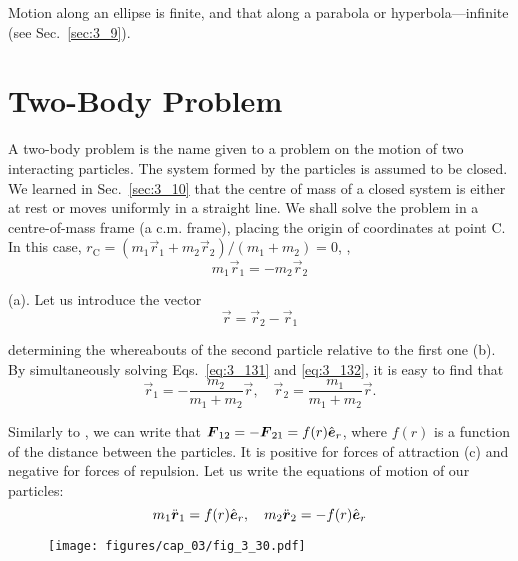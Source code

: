 Motion along an ellipse is finite, and that along a parabola or hyperbola---infinite (see Sec.~\ref{sec:3_9}).

\section{Two-Body Problem}\label{sec:3_19}

A two-body problem is the name given to a problem on the motion of two interacting particles. The system formed by the particles is assumed to be closed. We learned in Sec.~\ref{sec:3_10} that the centre of mass of a closed system is either at rest or moves uniformly in a straight line. We shall solve the problem in a centre-of-mass frame (a c.m. frame), placing the origin of coordinates at point C. In this case, $r_{\text{C}}=(m_1\vec{r}_1+m_2\vec{r}_2)/(m_1+m_2)=0$, \ie,
\begin{equation}\label{eq:3_131}
m_1\vec{r}_1 = -m_2\vec{r}_2
\end{equation}

\noindent
(a). Let us introduce the vector
\begin{equation}\label{eq:3_132}
\vec{r} = \vec{r}_2 - \vec{r}_1
\end{equation}

\noindent
determining the whereabouts of the second particle relative to the first one (b). By simultaneously solving Eqs.~\eqref{eq:3_131} and \eqref{eq:3_132}, it is easy to find that
\begin{equation}\label{eq:3_133}
\vec{r}_1 = -\frac{m_2}{m_1+m_2}\vec{r},\quad \vec{r}_2 = \frac{m_1}{m_1+m_2}\vec{r}.
\end{equation}

Similarly to , we can write that $\boldsymbol{F}_{12}=-\boldsymbol{F}_{21}=f(r)\hat{\boldsymbol{e}}_{r}$, where $f(r)$ is a function of the distance between the particles. It is positive for forces of attraction (c) and negative for forces of repulsion. Let us write the equations of motion of our particles:
\begin{equation*}
m_1\ddot{\boldsymbol{r}}_1 = f(r)\hat{\boldsymbol{e}}_{r},\quad m_2\ddot{\boldsymbol{r}}_2 = -f(r)\hat{\boldsymbol{e}}_{r}
\end{equation*}

\begin{figure}[t]
	\begin{center}
		\texttt{[image: figures/cap\_03/fig\_3\_30.pdf]}
		\caption[]{}
		\label{fig:3_30}
	\end{center}
\vspace{-0.7cm}
\end{figure}

